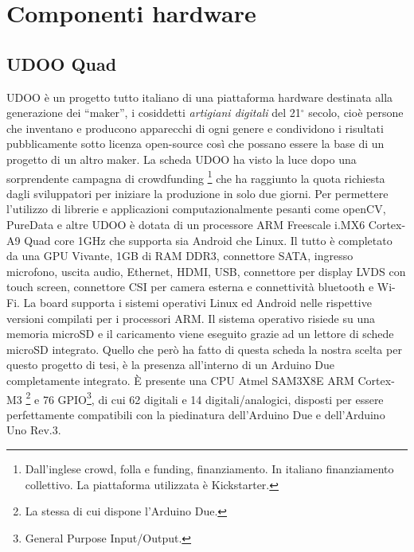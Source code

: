 \chapter{Componenti hardware}
\fancyfoot[C]{\thepage } 
\section{UDOO Quad}
UDOO è un progetto tutto italiano di una piattaforma hardware destinata alla 
generazione dei ``maker'', i cosiddetti \emph{artigiani digitali} del 21$^\circ$ secolo,
cioè persone che inventano e producono apparecchi di ogni genere e condividono i risultati 
pubblicamente sotto licenza open-source così che possano essere la base di un 
progetto di un altro maker. La 
scheda UDOO ha visto la luce dopo una sorprendente campagna di crowdfunding
\footnote{Dall'inglese crowd, folla e funding, finanziamento. In italiano 
finanziamento collettivo. La piattaforma utilizzata è Kickstarter.} che ha raggiunto la quota richiesta dagli sviluppatori 
per iniziare la produzione in solo due giorni. 
Per permettere l'utilizzo di librerie e applicazioni computazionalmente pesanti 
come openCV, PureData e altre UDOO è dotata di un processore ARM Freescale i.MX6 
Cortex-A9 Quad core 1GHz che supporta sia Android che Linux. Il tutto è 
completato da una GPU Vivante, 1GB di RAM DDR3, connettore SATA, ingresso microfono, 
uscita audio, Ethernet, HDMI, USB, connettore per display LVDS 
con touch screen, connettore CSI per camera esterna e connettività bluetooth e 
Wi-Fi. La board supporta i sistemi operativi Linux ed Android nelle rispettive 
versioni compilati per i processori ARM. Il sistema operativo risiede su una memoria 
microSD e il caricamento viene eseguito grazie ad un lettore di schede microSD integrato. 
Quello che però ha fatto di questa scheda la nostra scelta per questo 
progetto di tesi, è la presenza all'interno di un Arduino Due completamente integrato.
È presente una CPU Atmel SAM3X8E ARM Cortex-M3 \footnote{La stessa di cui 
dispone l'Arduino Due.} e 76 GPIO\footnote{General Purpose Input/Output.}, di 
cui 62 digitali e 14 digitali/analogici, disposti per essere perfettamente 
compatibili con la piedinatura dell'Arduino Due e dell'Arduino Uno Rev.3.

